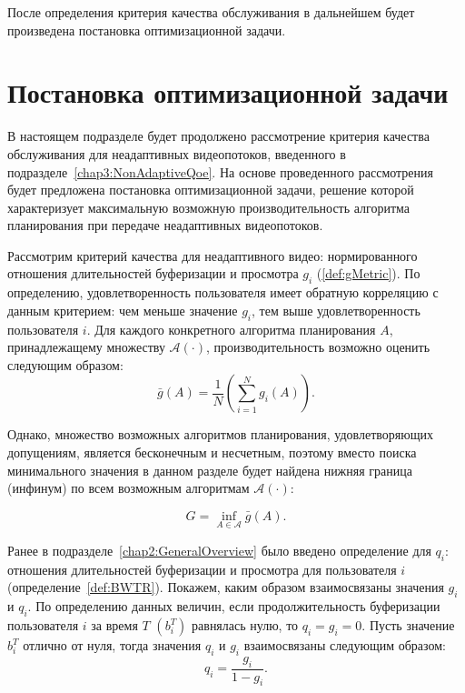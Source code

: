 После определения критерия качества обслуживания в дальнейшем будет произведена постановка оптимизационной задачи.

\section{Постановка оптимизационной задачи}
\label{chap3:NonAdaptiveOptimizationProblem}

В настоящем подразделе будет продолжено рассмотрение критерия качества обслуживания для неадаптивных видеопотоков, введенного в подразделе~\ref{chap3:NonAdaptiveQoe}. На основе проведенного рассмотрения будет предложена постановка оптимизационной задачи, решение которой характеризует максимальную возможную производительность алгоритма планирования при передаче неадаптивных видеопотоков.

Рассмотрим критерий качества для неадаптивного видео: нормированного отношения длительностей буферизации и просмотра $g_i$ (\ref{def:gMetric}). По определению, удовлетворенность пользователя имеет обратную корреляцию с данным критерием: чем меньше значение $g_i$, тем выше удовлетворенность пользователя $i$. Для каждого конкретного алгоритма планирования $A$, принадлежащему множеству $\mathcal{A}(\cdot)$, производительность возможно оценить следующим образом:
$$\bar{g}\left(A\right) = \frac{1}{N}\left(\sum\limits_{i=1}^{N} {g_i\left(A\right)}\right).$$

Однако, множество возможных алгоритмов планирования, удовлетворяющих допущениям, является бесконечным и несчетным, поэтому вместо поиска минимального значения в данном разделе будет найдена нижняя граница (инфинум) по всем возможным алгоритмам $\mathcal{A}(\cdot)$:

\begin{equation}
	\label{eq:gMetricGoal}
	G = \inf\limits_{A \in \mathcal{A}} \bar{g}\left(A\right).
\end{equation}

Ранее в подразделе~\ref{chap2:GeneralOverview} было введено определение для $q_i$: отношения длительностей буферизации и просмотра для пользователя $i$ (определение~\ref{def:BWTR}). Покажем, каким образом взаимосвязаны значения $g_i$ и $q_i$. По определению данных величин, если продолжительность буферизации пользователя $i$ за время $T$ $\left(b_i^T\right)$ равнялась нулю, то $q_i=g_i=0$. Пусть значение $b_i^T$ отлично от нуля, тогда значения $q_i$ и $g_i$ взаимосвязаны следующим образом:
$$q_i = \frac{g_i}{1-g_i}.$$

